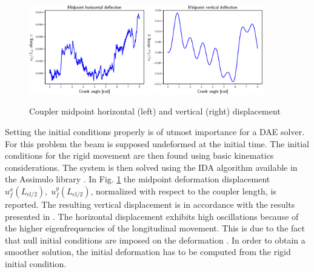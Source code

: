 \documentclass{svjour3}                     %
\begin{document}
\begin{figure}[tb]
	\centering
	\includegraphics[width=0.45\textwidth]{uM_disp.eps} 
	\includegraphics[width=0.45\textwidth]{wM_disp.eps} 
	\caption{Coupler midpoint horizontal (left) and vertical (right) displacement}
	\label{fig:defM_crsl}
\end{figure}

Setting the initial conditions properly is of utmost  importance for a DAE solver. For this problem the beam is supposed undeformed at the initial time. The initial conditions for the rigid movement are then found using basic kinematics considerations.  The system is then solved using the IDA algorithm available in the Assimulo library \cite{assimulo}. In Fig. \ref{fig:defM_crsl} the midpoint deformation displacement $u_f^x(L_{\text{cl}/2}),\; u_f^y(L_{\text{cl}/2})$, normalized with respect to the coupler length, is reported. The resulting vertical displacement is in accordance with the results presented in \cite{Ellenbroek2018}. The horizontal displacement exhibits high oscillations because of the higher eigenfrequencies of the longitudinal movement. This is due to the fact that null initial conditions are imposed on the deformation \cite{MB_Daepde}. In order to obtain a smoother solution, the initial deformation has to be computed from the rigid initial condition.
\end{document}
